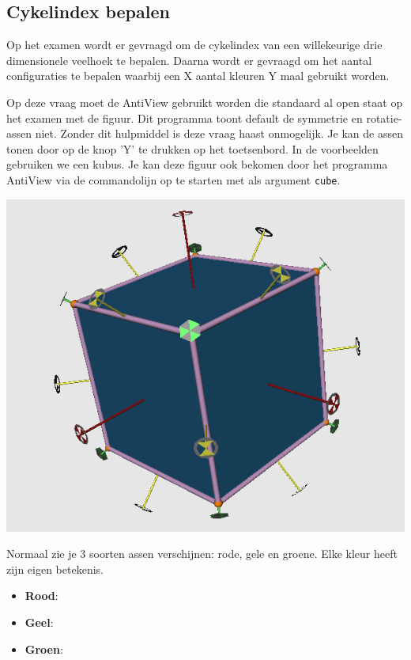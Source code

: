 \documentclass{article}
\begin{document}
\subsection{Cykelindex bepalen}
Op het examen wordt er gevraagd om de cykelindex van een willekeurige drie dimensionele veelhoek te bepalen. Daarna wordt er gevraagd om het aantal configuraties te bepalen waarbij een X aantal kleuren Y maal gebruikt worden.

Op deze vraag moet de AntiView gebruikt worden die standaard al open staat op het examen met de figuur. Dit programma toont default de symmetrie en rotatie-assen niet. Zonder dit hulpmiddel is deze vraag haast onmogelijk. Je kan de assen tonen door op de knop 'Y' te drukken op het toetsenbord. In de voorbeelden gebruiken we een kubus. Je kan deze figuur ook bekomen door het programma AntiView via de commandolijn op te starten met als argument \texttt{cube}.

\begin{center}
 \includegraphics[width=\linewidth]{antiview_cube_1}
\end{center}

Normaal zie je 3 soorten assen verschijnen: rode, gele en groene. Elke kleur heeft zijn eigen betekenis.
\begin{itemize}
 \item \textbf{Rood}:
 \item \textbf{Geel}:
 \item \textbf{Groen}:
\end{itemize}
\end{document}

